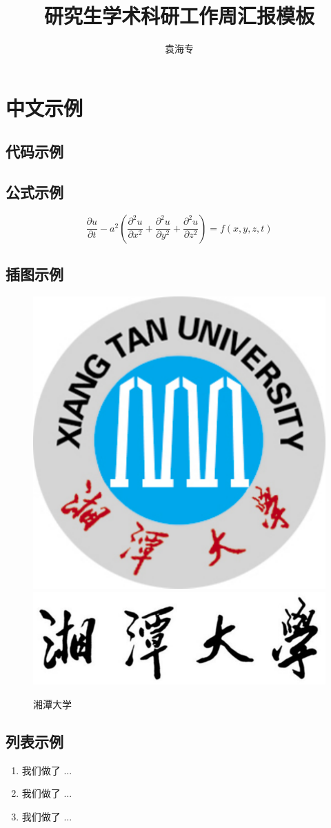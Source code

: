 \documentclass[12pt]{article}  %
\title{研究生学术科研工作周汇报模板}  %
\author{袁海专}
\begin{document}
\maketitle 


\section{中文示例}
\subsection{代码示例}


\subsection{公式示例}
\begin{equation}\label{eq:heat}
\frac{\partial u}{\partial t} - a^2 \left( \frac{\partial^2 u}{\partial x^2} + \frac{\partial^2 u}{\partial y^2} + \frac{\partial^2 u}{\partial z^2} \right) = f(x, y, z, t)
\end{equation}

\subsection{插图示例}
\begin{figure}[htbp]
  \centering
  \includegraphics[width=.2\textwidth]{./figures/xtu-fig-logo.pdf} \quad 
  \includegraphics[width=.6\textwidth]{./figures/xtu-text-logo.pdf}
\caption{湘潭大学}\label{fig:result}
\end{figure}

\subsection{列表示例}
\begin{enumerate}[\bfseries 1.]
    \item 我们做了 ...
    \item 我们做了 ...
    \item 我们做了 ...
\end{enumerate}
\end{document}
